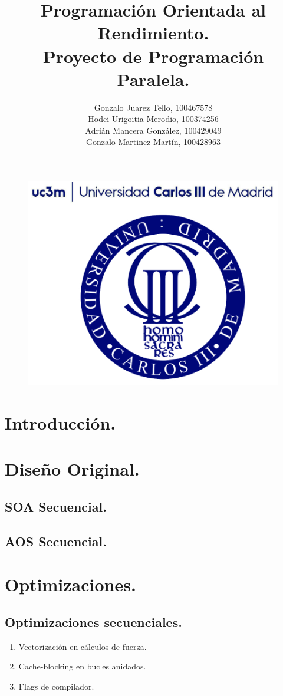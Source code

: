 \documentclass{article}
\title{Programación Orientada al Rendimiento.\\Proyecto de Programación Paralela.}
\author{
	Gonzalo Juarez Tello, 100467578\\
	Hodei Urigoitia Merodio, 100374256\\
	Adrián Mancera González, 100429049\\
	Gonzalo Martinez Martín, 100428963
}
\date{}
\begin{document}
\begin{figure}
	\includegraphics[width=\linewidth,height=0.7\textwidth]{resources/logo_uc3m.png}
\end{figure}

\maketitle
\newpage

\tableofcontents
\newpage

\section{Introducción.\label{intro}}

\section{Diseño Original.\label{original}}
\subsection{SOA Secuencial.}
\subsection{AOS Secuencial.}

\section{Optimizaciones.\label{opt}}
\subsection{Optimizaciones secuenciales.\label{opt_seq}}
\begin{enumerate}
\item Vectorización en cálculos de fuerza.
\item Cache-blocking en bucles anidados.
\item Flags de compilador.
\end{enumerate}
\end{document}
